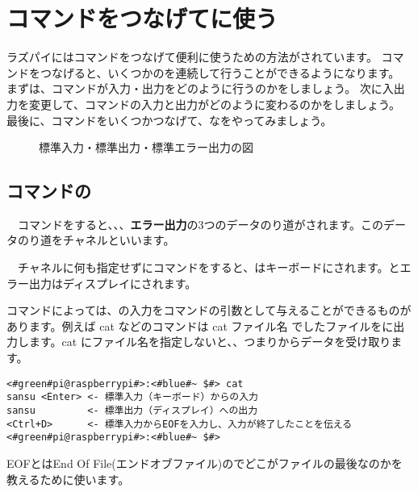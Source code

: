 \newpage
\section{コマンドをつなげてに使う}
ラズパイにはコマンドをつなげて便利に使うための方法がされています。
コマンドをつなげると、いくつかのを連続して行うことができるようになります。
まずは、コマンドが入力・出力をどのように行うのかをしましょう。
次に入出力を変更して、コマンドの入力と出力がどのように変わるのかをしましょう。
最後に、コマンドをいくつかつなげて、なをやってみましょう。

\begin{figure}[h]
    \centering
    
    \caption{標準入力・標準出力・標準エラー出力の図}
    \label{ch03:stdioerr}
\end{figure}

\subsection{コマンドの}
　コマンドをすると、{\bf {}}、{\bf {}}、{\bf {}エラー出力}の3つのデータのり道がされます。このデータのり道をチャネルといいます。

　チャネルに何も指定せずにコマンドをすると、はキーボードにされます。とエラー出力はディスプレイにされます。


コマンドによっては、の入力をコマンドの引数として与えることができるものがあります。例えば cat などのコマンドは cat ファイル名 でしたファイルをに出力します。cat にファイル名を指定しないと、、つまりからデータを受け取ります。

\begin{lstlisting}[caption=catの標準入力・標準出力, label=stdioCat]
<#green#pi@raspberrypi#>:<#blue#~ $#> cat 
sansu <Enter> <- 標準入力（キーボード）からの入力
sansu         <- 標準出力（ディスプレイ）への出力
<Ctrl+D>      <- 標準入力からEOFを入力し、入力が終了したことを伝える
<#green#pi@raspberrypi#>:<#blue#~ $#>
\end{lstlisting}
EOFとはEnd Of File(エンドオブファイル)のでどこがファイルの最後なのかを教えるために使います。

